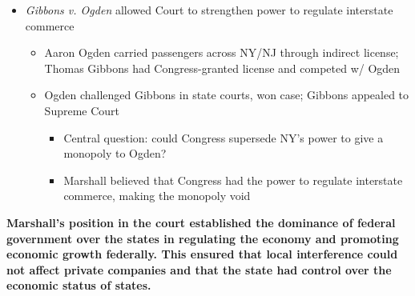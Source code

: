 \documentclass[a4paper]{article}
\begin{document}
{\begin{itemize}
\begin{itemize}
        \end{itemize}
        \item \textit{Gibbons v. Ogden} allowed Court to strengthen power to regulate interstate commerce
        \begin{itemize}
            \item Aaron Ogden carried passengers across NY/NJ through indirect license; Thomas Gibbons had Congress-granted license and competed w/ Ogden
            \item Ogden challenged Gibbons in state courts, won case; Gibbons appealed to Supreme Court
            \begin{itemize}
                \item Central question: could Congress supersede NY's power to give a monopoly to Ogden?
                \item Marshall believed that Congress had the power to regulate interstate commerce, making the monopoly void
            \end{itemize}
        \end{itemize}
    \end{itemize}
    \textbf{Marshall's position in the court established the dominance of federal government over the states in regulating the economy and promoting economic growth federally. This ensured that local interference could not affect private companies and that the state had control over the economic status of states.}}
\end{document}
